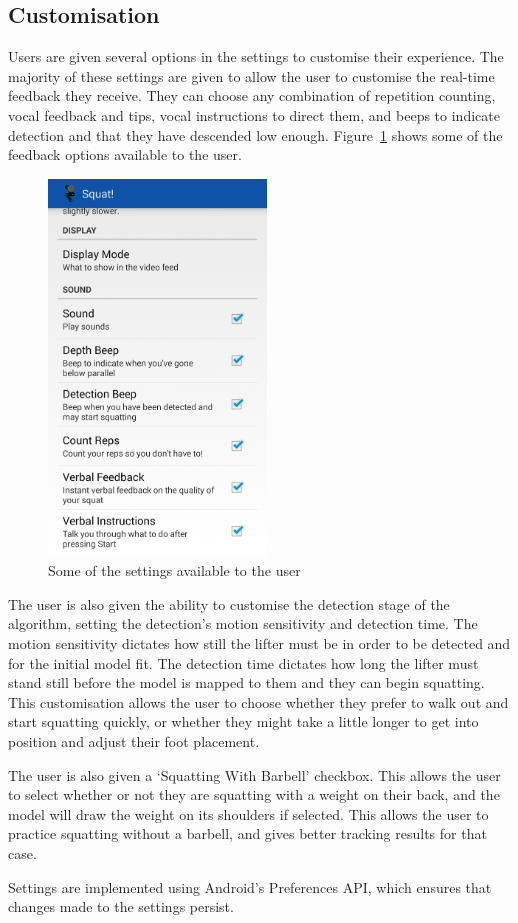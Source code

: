 \subsection{Customisation}

Users are given several options in the settings to customise their experience. The majority of these settings are given to allow the user to customise the real-time feedback they receive. They can choose any combination of repetition counting, vocal feedback and tips, vocal instructions to direct them, and beeps to indicate detection and that they have descended low enough. Figure~\ref{fig:settings} shows some of the feedback options available to the user.

\begin{figure}[H]
    \centering
	\includegraphics[height=10cm]{application/images/settings}
\caption{Some of the settings available to the user}
\label{fig:settings}
\end{figure}

The user is also given the ability to customise the detection stage of the algorithm, setting the detection's motion sensitivity and detection time. The motion sensitivity dictates how still the lifter must be in order to be detected and for the initial model fit. The detection time dictates how long the lifter must stand still before the model is mapped to them and they can begin squatting. This customisation allows the user to choose whether they prefer to walk out and start squatting quickly, or whether they might take a little longer to get into position and adjust their foot placement.

The user is also given a `Squatting With Barbell' checkbox. This allows the user to select whether or not they are squatting with a weight on their back, and the model will draw the weight on its shoulders if selected. This allows the user to practice squatting without a barbell, and gives better tracking results for that case.

Settings are implemented using Android's Preferences API, which ensures that changes made to the settings persist.